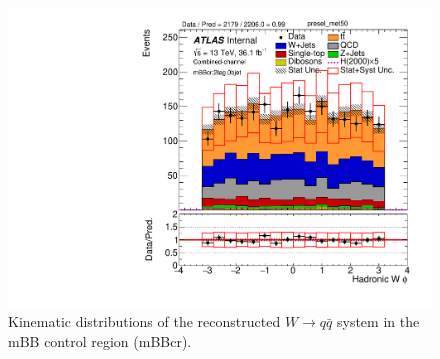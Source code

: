 \begin{figure}[!h]
\begin{center}
\includegraphics[scale=0.33]{./figures/boosted/PlotsInMbbCR/DataMC_2tag_0bjet_mbbcr_lepton_presel_met50_WhadPhi}
\caption{Kinematic distributions of the reconstructed $W \to q\bar{q}$ system in the mBB control region (mBBcr).}
\label{fig:boosted_mbbcr_whad}
\end{center}
\end{figure}
 

